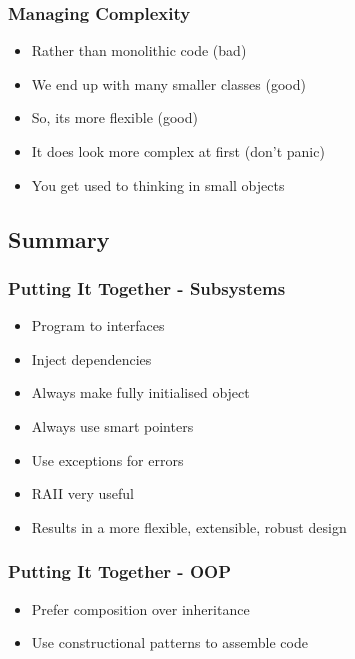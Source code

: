 \subsubsection{Managing Complexity}\label{managing-complexity}

\begin{itemize}
\itemsep1pt\parskip0pt
\item
  Rather than monolithic code (bad)
\item
  We end up with many smaller classes (good)
\item
  So, its more flexible (good)
\item
  It does look more complex at first (don't panic)
\item
  You get used to thinking in small objects
\end{itemize}

\subsection{Summary}\label{summary-3}

\subsubsection{Putting It Together -
Subsystems}\label{putting-it-together---subsystems}

\begin{itemize}
\itemsep1pt\parskip0pt
\item
  Program to interfaces
\item
  Inject dependencies
\item
  Always make fully initialised object
\item
  Always use smart pointers
\item
  Use exceptions for errors
\item
  RAII very useful
\item
  Results in a more flexible, extensible, robust design
\end{itemize}

\subsubsection{Putting It Together -
OOP}\label{putting-it-together---oop}

\begin{itemize}
\itemsep1pt\parskip0pt
\item
  Prefer composition over inheritance
\item
  Use constructional patterns to assemble code
\end{itemize}

